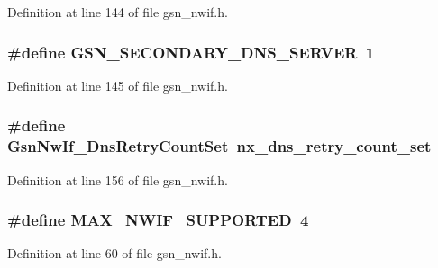 Definition at line 144 of file gsn\_\-nwif.h.

\hypertarget{a00534_aba4c680932594158782a3e4771a41dd3}{
\subsubsection[{GSN\_\-SECONDARY\_\-DNS\_\-SERVER}]{\setlength{\rightskip}{0pt plus 5cm}\#define GSN\_\-SECONDARY\_\-DNS\_\-SERVER~1}}
\label{a00534_aba4c680932594158782a3e4771a41dd3}


Definition at line 145 of file gsn\_\-nwif.h.

\hypertarget{a00534_a70c487092384608962401dd2bef50b2a}{
\subsubsection[{GsnNwIf\_\-DnsRetryCountSet}]{\setlength{\rightskip}{0pt plus 5cm}\#define GsnNwIf\_\-DnsRetryCountSet~nx\_\-dns\_\-retry\_\-count\_\-set}}
\label{a00534_a70c487092384608962401dd2bef50b2a}


Definition at line 156 of file gsn\_\-nwif.h.

\hypertarget{a00534_a6debabbbdf43227c2cae9dd80f7fa657}{
\subsubsection[{MAX\_\-NWIF\_\-SUPPORTED}]{\setlength{\rightskip}{0pt plus 5cm}\#define MAX\_\-NWIF\_\-SUPPORTED~4}}
\label{a00534_a6debabbbdf43227c2cae9dd80f7fa657}


Definition at line 60 of file gsn\_\-nwif.h.



